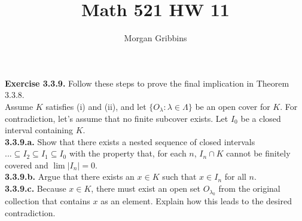 \documentclass[12pt,letterpaper]{article}
\title{Math 521 HW 11}
\author{Morgan Gribbins}
\date{}
\begin{document}
	
\maketitle

\textbf{Exercise 3.3.9.} Follow these steps to prove the final implication in Theorem 3.3.8. \\

Assume \(K\) satisfies (i) and (ii), and let \(\{O_{\lambda} : \lambda \in \Lambda\}\) be an open cover for \(K\). For contradiction, let's assume that no finite subcover exists. Let \(I_{0}\) be a closed interval containing \(K\). \\

\textbf{3.3.9.a.} Show that there exists a nested sequence of closed intervals \(... \subseteq I_{2} \subseteq I_{1} \subseteq I_{0}\) with the property that, for each \(n\), \(I_{n} \cap K\) cannot be finitely covered and \(\lim |I_{n}| = 0.\) \\



\textbf{3.3.9.b.} Argue that there exists an \(x \in K\) such that \(x \in I_{n}\) for all \(n\). \\



\textbf{3.3.9.c.} Because \(x\in K\), there must exist an open set \(O_{\lambda_{0
}}\) from the original collection that contains \(x\) as an element. Explain how this leads to the desired contradiction. \\
\end{document}
